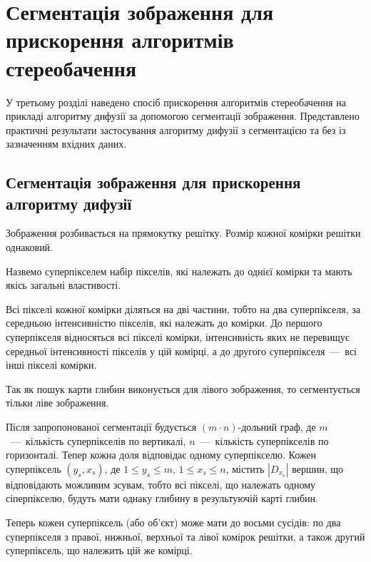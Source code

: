 \chapter{Сегментація зображення для прискорення алгоритмів стереобачення}

У третьому розділі наведено спосіб прискорення алгоритмів стереобачення
на прикладі алгоритму дифузії за допомогою сегментації зображення.
Представлено практичні результати
застосування алгоритму дифузії з сегментацією
та без із зазначенням вхідних даних.

\section{Сегментація зображення для прискорення алгоритму дифузії}

Зображення розбивається на прямокутку решітку.
Розмір кожної комірки решітки однаковий.


Назвемо суперпікселем набір пікселів,
які належать до однієї комірки та мають якісь загальні властивості.

Всі пікселі кожної комірки діляться на дві частини, тобто на два суперпікселя,
за середньою інтенсивністю пікселів, які належать до комірки.
До першого суперпікселя відносяться всі пікселі комірки,
інтенсивність яких не перевищує середньої інтенсивності пікселів у цій комірці,
а до другого суперпікселя~---~всі інші пікселі комірки.


Так як пошук карти глибин виконується для лівого зображення,
то сегментується тільки ліве зображення.

Після запропонованої сегментації будується
$\left(m \cdot n \right)$-дольний граф,
де $m$~---~кількість суперпікселів по вертикалі,
$n$~---~кількість суперпікселів по горизонталі.
Тепер кожна доля відповідає одному суперпікселю.
Кожен суперпіксель $\left(y_s, x_s \right)$,
де $1 \leq y_s \leq m, \, 1 \leq x_s \leq n$,
містить $\left| D_{x_s} \right|$ вершин,
що відповідають можливим зсувам, тобто всі пікселі,
що належать одному сіперпікселю,
будуть мати однаку глибину в результуючій карті глибин.

Теперь кожен суперпіксель (або об'єкт) може мати до восьми сусідів:
по два суперпікселя з правої, нижньої, верхньої та лівої комірок решітки,
а також другий суперпіксель, що належить цій же комірці.


